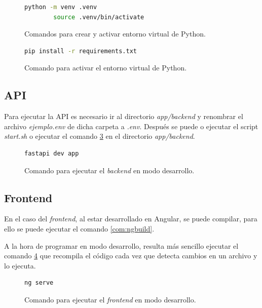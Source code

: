 \begin{figure}
	\begin{lstlisting}[language=Bash]
		python -m venv .venv
		source .venv/bin/activate
	\end{lstlisting}
	\caption{Comandos para crear y activar entorno virtual de Python.}
	\label{com:pythonvenv}
\end{figure}

\begin{figure}
	\begin{lstlisting}[language=Bash]
		pip install -r requirements.txt
	\end{lstlisting}
	\caption{Comando para activar el entorno virtual de Python.}
	\label{com:pip}
\end{figure}

\subsection{API}
Para ejecutar la API es necesario ir al directorio \textit{app/backend} y renombrar el archivo \textit{ejemplo.env} de dicha carpeta a \textit{.env}. Después se puede o ejecutar el script \textit{start.sh} o ejecutar el comando  \ref{com:fastapidev} en el directorio \textit{app/backend}.

\begin{figure}
	\begin{lstlisting}[language=Bash]
		fastapi dev app
	\end{lstlisting}
	\caption{Comando para ejecutar el \textit{backend} en modo desarrollo.}
	\label{com:fastapidev}
\end{figure}
\subsection{Frontend}
En el caso del \textit{frontend}, al estar desarrollado en Angular, se puede compilar, para ello se puede ejecutar el comando \ref{com:ngbuild}.

A la hora de programar en modo desarrollo, resulta más sencillo ejecutar el comando \ref{com:ngserve} que recompila el código cada vez que detecta cambios en un archivo y lo ejecuta.
\begin{figure}
	\begin{lstlisting}[language=Bash]
		ng serve
	\end{lstlisting}
	\caption{Comando para ejecutar el \textit{frontend} en modo desarrollo.}
	\label{com:ngserve}
\end{figure}

